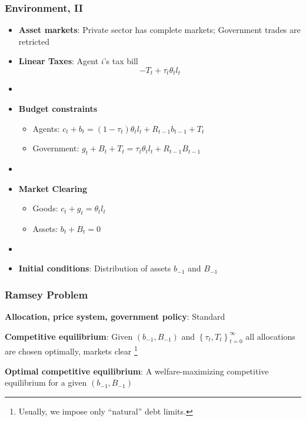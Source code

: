\documentclass{beamer}
\begin{document}
\begin{frame}
 \frametitle{Environment, II}
 \begin{itemize}
\item \textbf{Asset markets}: Private sector has complete markets; Government trades are retricted
  \item \textbf{Linear Taxes}: Agent $i$'s tax bill
\[- T_t + \tau_t \theta_{t}l_{t}\]

\item[]
  \item \textbf{Budget constraints}
  \begin{itemize}
   \item Agents: $ c_{t}+b_{t}=\left( 1-\tau _{t}\right) \theta _{t}l_{t}+R_{t-1}b_{t-1}+T_{t}$
\item Government: $g_{t}+B_{t}+T_t=\tau _{t}\theta_{t}l_{t}+R_{t-1}B_{t-1}$
  \end{itemize}

\item[]
  \item \textbf{Market Clearing}
  \begin{itemize}
   \item Goods: $c_{t}+g_t = \theta _{t} l_{t}$

   \item Assets: $b_{t}+B_{t}=0$
\end{itemize}
  \item[]

\item \textbf{Initial conditions}: Distribution of assets $b_{-1}$ and $B_{-1}$
\end{itemize}

\end{frame}


\begin{frame}
 \frametitle{Ramsey Problem}

\begin{definition}
\textbf{Allocation, price system, government policy}: Standard

\end{definition}

\begin{definition}
\textbf{Competitive equilibrium}: Given $\left(b_{-1},B_{-1}\right) $ and $\left\{ \tau _{t},T_{t}\right\} _{t=0}^{\infty }$
all allocations are chosen optimally, markets clear \footnote{Usually, we impose only  ``natural'' debt limits. }
\end{definition}

\begin{definition}
\textbf{Optimal competitive equilibrium}: A welfare-maximizing competitive
equilibrium for a given $\left( b_{-1},B_{-1}\right) $
\end{definition}

 \end{frame}
 
\end{document}
